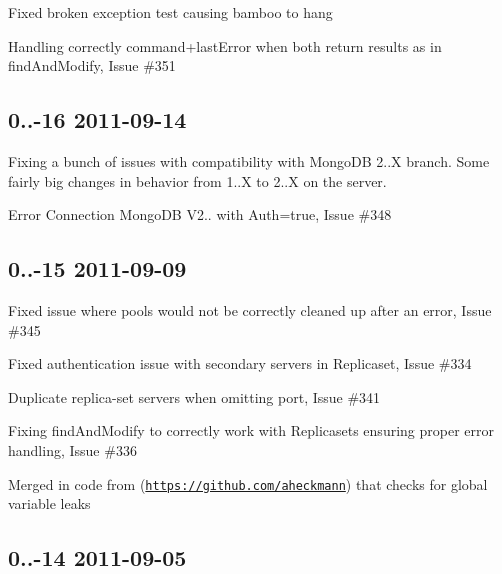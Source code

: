 \begin{DoxyItemize}
\item Fixed broken exception test causing bamboo to hang
\item Handling correctly command+last\+Error when both return results as in find\+And\+Modify, Issue \#351
\end{DoxyItemize}

\subsection*{0..-\/16 2011-\/09-\/14 }


\begin{DoxyItemize}
\item Fixing a bunch of issues with compatibility with Mongo\+DB 2..\+X branch. Some fairly big changes in behavior from 1..\+X to 2..\+X on the server.
\item Error Connection Mongo\+DB V2.. with Auth=true, Issue \#348
\end{DoxyItemize}

\subsection*{0..-\/15 2011-\/09-\/09 }


\begin{DoxyItemize}
\item Fixed issue where pools would not be correctly cleaned up after an error, Issue \#345
\item Fixed authentication issue with secondary servers in Replicaset, Issue \#334
\item Duplicate replica-\/set servers when omitting port, Issue \#341
\item Fixing find\+And\+Modify to correctly work with Replicasets ensuring proper error handling, Issue \#336
\item Merged in code from (\href{https://github.com/aheckmann}{\tt https\+://github.\+com/aheckmann}) that checks for global variable leaks
\end{DoxyItemize}

\subsection*{0..-\/14 2011-\/09-\/05 }


